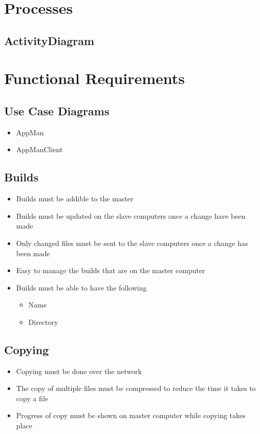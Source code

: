 \documentclass[a4paper,12pt,final]{article}
\begin{document}
\section{Processes}
\subsection{ActivityDiagram}

\section{Functional Requirements}
\subsection{Use Case Diagrams}
\begin{itemize}
\item AppMan
\item AppManClient
\end{itemize}

\subsection{Builds}
\begin{itemize}
\item Builds must be addible to the master
\item Builds must be updated on the slave computers once a change have been made
\item Only changed files must be sent to the slave computers once a change has been made
\item Easy to manage the builds that are on the master computer
\item Builds must be able to have the following
\begin{itemize}
\item Name
\item Directory
\end{itemize}
\end{itemize}

\subsection{Copying}
\begin{itemize}
\item Copying must be done over the network
\item The copy of multiple files must be compressed to reduce the time it takes to copy a file
\item Progress of copy must be shown on master computer while copying takes place
\end{itemize}
\end{document}
